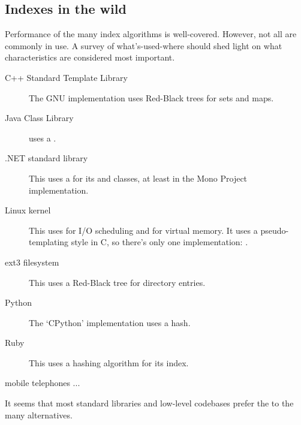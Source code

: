 \subsection{Indexes in the wild}

Performance of the many index algorithms is well-covered.
However, not all are commonly in use.
A survey of what's-used-where
  should shed light on
  what characteristics are considered most important.

\begin{description}

\item[C++ Standard Template Library]
The GNU implementation
  uses Red-Black trees for sets and maps.\footnotemark


\item[Java Class Library]
 uses a \RBt.\footnotemark


\item[.NET standard library]
This uses a \RBt for its  and  classes,
  at least in the Mono Project implementation\cite{RBTree_cs}.

\item[Linux kernel]
This uses \RBts for I/O scheduling and for virtual memory.
It uses a pseudo-templating style in C, so there's only one implementation: .\footnotemark


\item[ext3 filesystem]
This uses a Red-Black tree for directory entries.

\item[Python]
The `CPython' implementation uses a hash.\footnotemark


\item[Ruby]
This uses a hashing algorithm for its index.

\item[mobile telephones ...]

\end{description}

It seems that
  most standard libraries
  and low-level codebases
  prefer the \RBt
  to the many alternatives.
